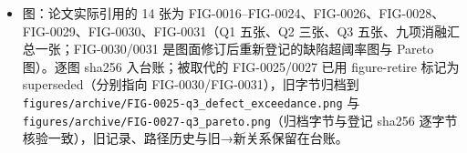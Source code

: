 \documentclass[
  11pt,
]{article}
\begin{document}
\begin{itemize}
\begin{itemize}
    1.0，两种策略在「绝对不增」与 cap-at-max
    下的严格性差异如下：绝对不增策略（c\_new≤c\_source）的严格逐缺陷不增率为
    1.000，cap-at-max
    策略（c\_new≤max(c\_source,T)）的\textbf{严格达标率}为
    0.1818（逐缺陷：DMS 0.2727、2,3-butanedione 0.5455（mean
    阈值）/0.7273（median 阈值）、4VG 0.4545；t2n 与 stale\_hops 为 1.0
    但两者是 Q1 线性代理，CV R² 0.055/0.050）。四种情景的可行率都是
    1.000，平均 L1
    改动与目标马氏距离几乎相同，因此两种策略的差别是\textbf{约束保证的强度}（严格不增
    vs 不超过 max(source,T)），而不是可行性或代价上的张力；0.1818
    描述的是 cap-at-max 输出的严格达标比例，不能读成「只有 18.18\%
    的源样本存在严格不增可行解」。对 t2n/stale 两个代理约束做 100
    次标签代理重抽样，其联合非恶化率的 2.5\% 分位为
    0.2727（代理口径，不是五类缺陷严格率的下界）。约束优化把到 Tripel
    的马氏距离由分位数初始化的 1.481 降到 0.433，平均 L1 改动 7.19；mean
    与 median 两套阈值情景的目标距离几乎相同。
  \item
    三项预注册稳健性判定全部通过：Q1 训练内 CV MAE 在 seed 与 λ
    扰动下的相对极差 0.00447（≤0.03，ROB-0001 重算记录）；Q2
    topk-jaccard 在 seed 与 τ 扰动下相对极差 0（≤0.05，ROB-0002）；Q3
    归一化能量距离在 seed 与 κ 扰动下相对极差
    0.0827（≤0.25，ROB-0003），且 constraint-satisfaction 恒为 1.0。
  \end{itemize}
\item
  图：论文实际引用的 14 张为
  FIG-0016--FIG-0024、FIG-0026、FIG-0028、FIG-0029、FIG-0030、FIG-0031（Q1
  五张、Q2 三张、Q3 五张、九项消融汇总一张；FIG-0030/0031
  是图面修订后重新登记的缺陷超阈率图与 Pareto 图）。逐图 sha256
  入台账；被取代的 FIG-0025/0027 已用 figure-retire 标记为
  superseded（分别指向 FIG-0030/FIG-0031），旧字节归档到
  \texttt{figures/archive/FIG-0025-q3\_defect\_exceedance.png} 与
  \texttt{figures/archive/FIG-0027-q3\_pareto.png}（归档字节与登记
  sha256 逐字节核验一致），旧记录、路径历史与旧→新关系保留在台账。
\end{itemize}
\end{document}
